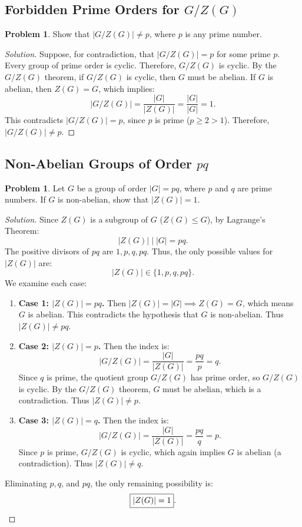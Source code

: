 \documentclass[12pt]{article}
\theoremstyle{definition}
\newtheorem{problem}[definition]{Problem}
\theoremstyle{plain}
\begin{document}
\subsection{Forbidden Prime Orders for \texorpdfstring{$G/Z(G)$}{G/Z(G)}}

\begin{problem}
Show that $|G/Z(G)| \neq p$, where $p$ is any prime number.
\end{problem}

\begin{proof}[Solution]
Suppose, for contradiction, that $|G/Z(G)| = p$ for some prime $p$.
Every group of prime order is cyclic.
Therefore, $G/Z(G)$ is cyclic.
By the $G/Z(G)$ theorem, if $G/Z(G)$ is cyclic, then $G$ must be abelian.
If $G$ is abelian, then $Z(G) = G$, which implies:
\[
|G/Z(G)| = \frac{|G|}{|Z(G)|} = \frac{|G|}{|G|} = 1.
\]
This contradicts $|G/Z(G)| = p$, since $p$ is prime ($p \ge 2 > 1$).
Therefore, $\boxed{|G/Z(G)| \neq p}$.
\end{proof}

\subsection{Non-Abelian Groups of Order \texorpdfstring{$pq$}{pq}}

\begin{problem}
Let $G$ be a group of order $|G| = pq$, where $p$ and $q$ are prime numbers. If $G$ is non-abelian, show that $|Z(G)| = 1$.
\end{problem}

\begin{proof}[Solution]
Since $Z(G)$ is a subgroup of $G$ ($Z(G) \le G$), by Lagrange's Theorem:
\[
|Z(G)| \mid |G| = pq.
\]
The positive divisors of $pq$ are $1, p, q, pq$.
Thus, the only possible values for $|Z(G)|$ are:
\[
|Z(G)| \in \{1, p, q, pq\}.
\]
We examine each case:
\begin{enumerate}
    \item \textbf{Case 1: $|Z(G)| = pq$.}
    Then $|Z(G)| = |G| \implies Z(G) = G$, which means $G$ is abelian.
    This contradicts the hypothesis that $G$ is non-abelian. Thus $|Z(G)| \neq pq$.
    
    \item \textbf{Case 2: $|Z(G)| = p$.}
    Then the index is:
    \[
    |G/Z(G)| = \frac{|G|}{|Z(G)|} = \frac{pq}{p} = q.
    \]
    Since $q$ is prime, the quotient group $G/Z(G)$ has prime order, so $G/Z(G)$ is cyclic.
    By the $G/Z(G)$ theorem, $G$ must be abelian, which is a contradiction.
    Thus $|Z(G)| \neq p$.
    
    \item \textbf{Case 3: $|Z(G)| = q$.}
    Then the index is:
    \[
    |G/Z(G)| = \frac{|G|}{|Z(G)|} = \frac{pq}{q} = p.
    \]
    Since $p$ is prime, $G/Z(G)$ is cyclic, which again implies $G$ is abelian (a contradiction).
    Thus $|Z(G)| \neq q$.
\end{enumerate}
Eliminating $p, q$, and $pq$, the only remaining possibility is:
\[
\boxed{|Z(G)| = 1}. \qedhere
\]
\end{proof}
\end{document}
